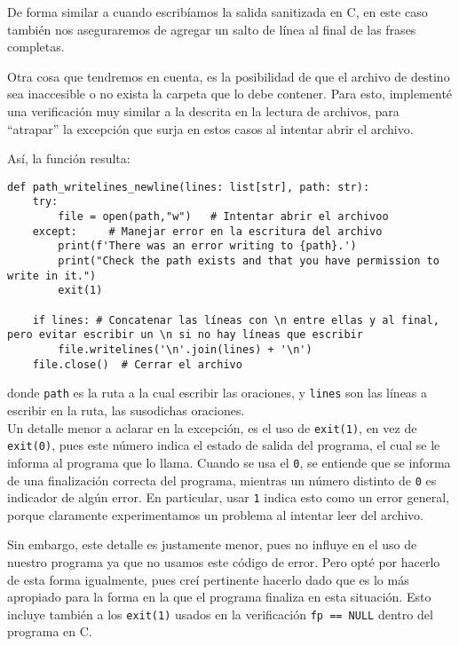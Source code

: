 \documentclass[a4paper]{article}
\begin{document}
De forma similar a cuando escribíamos la salida sanitizada en C, en este caso también nos aseguraremos de agregar un salto de línea al final de las frases completas.

Otra cosa que tendremos en cuenta, es la posibilidad de que el archivo de destino sea inaccesible o no exista la carpeta que lo debe contener. Para esto, implementé una verificación muy similar a la descrita en la lectura de archivos, para ``atrapar'' la excepción que surja en estos casos al intentar abrir el archivo.

Así, la función resulta:
\begin{verbatim}
def path_writelines_newline(lines: list[str], path: str):
    try:
        file = open(path,"w")   # Intentar abrir el archivoo
    except:     # Manejar error en la escritura del archivo
        print(f'There was an error writing to {path}.')
        print("Check the path exists and that you have permission to write in it.")
        exit(1)

    if lines: # Concatenar las líneas con \n entre ellas y al final, pero evitar escribir un \n si no hay líneas que escribir
        file.writelines('\n'.join(lines) + '\n')
    file.close()  # Cerrar el archivo
\end{verbatim}

\noindent donde \texttt{path} es la ruta a la cual escribir las oraciones, y \texttt{lines} son las líneas a escribir en la ruta, las susodichas oraciones. \\

Un detalle menor a aclarar en la excepción, es el uso de \texttt{exit(1)}, en vez de \texttt{exit(0)}, pues este número indica el estado de salida del programa, el cual se le informa al programa que lo llama. Cuando se usa el \texttt{0}, se entiende que se informa de una finalización correcta del programa, mientras un número distinto de \texttt{0} es indicador de algún error. En particular, usar \texttt{1} indica esto como un error general, porque claramente experimentamos un problema al intentar leer del archivo. 

Sin embargo, este detalle es justamente menor, pues no influye en el uso de nuestro programa ya que no usamos este código de error. Pero opté por hacerlo de esta forma igualmente, pues creí pertinente hacerlo dado que es lo más apropiado para la forma en la que el programa finaliza en esta situación. Esto incluye también a los \texttt{exit(1)} usados en la verificación \texttt{fp == NULL} dentro del programa en C. \\
\end{document}
